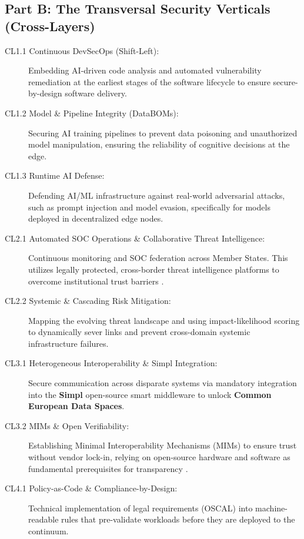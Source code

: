 \documentclass[12pt,a4paper]{article}
\begin{document}
\subsection*{Part B: The Transversal Security Verticals (Cross-Layers)}
\begin{description}
\item[CL1.1 Continuous DevSecOps (Shift-Left):] Embedding AI-driven code analysis and automated vulnerability remediation at the earliest stages of the software lifecycle to ensure secure-by-design software delivery.

\item[CL1.2 Model \& Pipeline Integrity (DataBOMs):] Securing AI training pipelines to prevent data poisoning and unauthorized model manipulation, ensuring the reliability of cognitive decisions at the edge.

\item[CL1.3 Runtime AI Defense:] Defending AI/ML infrastructure against real-world adversarial attacks, such as prompt injection and model evasion, specifically for models deployed in decentralized edge nodes.

\item[CL2.1 Automated SOC Operations \& Collaborative Threat Intelligence:] Continuous monitoring and SOC federation across Member States. This utilizes legally protected, cross-border threat intelligence platforms to overcome institutional trust barriers \cite{concordia}.

\item[CL2.2 Systemic \& Cascading Risk Mitigation:] Mapping the evolving threat landscape and using impact-likelihood scoring to dynamically sever links and prevent cross-domain systemic infrastructure failures.

\item[CL3.1 Heterogeneous Interoperability \& Simpl Integration:] Secure communication across disparate systems via mandatory integration into the \textbf{Simpl} open-source smart middleware \cite{cloud_edge_roadmap} to unlock \textbf{Common European Data Spaces}.

\item[CL3.2 MIMs \& Open Verifiability:] Establishing Minimal Interoperability Mechanisms (MIMs) to ensure trust without vendor lock-in, relying on open-source hardware and software as fundamental prerequisites for transparency \cite{cloud_edge_roadmap}.

\item[CL4.1 Policy-as-Code \& Compliance-by-Design:] Technical implementation of legal requirements (OSCAL) into machine-readable rules that pre-validate workloads before they are deployed to the continuum.


\end{description}
\end{document}
